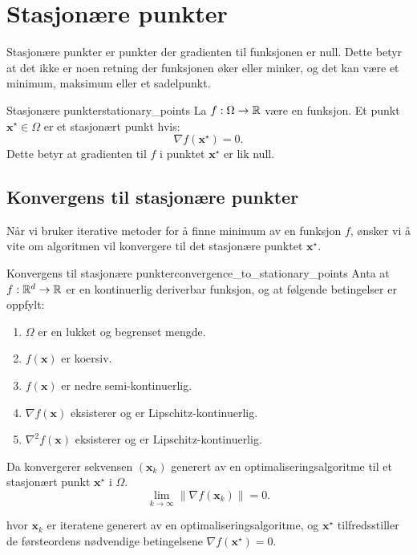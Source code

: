 \section{Stasjonære punkter}
Stasjonære punkter er punkter der gradienten til funksjonen er null. Dette betyr at det ikke er noen retning der funksjonen øker eller minker, og det kan være et minimum, maksimum eller et sadelpunkt.

\begin{definition}{Stasjonære punkter}{stationary_points}
	La \(f: \Omega \to \mathbb{R}\) være en funksjon. Et punkt \(\symbf{x}^\star \in \Omega\) er et stasjonært punkt hvis:
	\[
		\nabla f(\symbf{x}^\star) = 0.
	\]
	Dette betyr at gradienten til \(f\) i punktet \(\symbf{x}^\star\) er lik null.
\end{definition}

\subsection{Konvergens til stasjonære punkter}
Når vi bruker iterative metoder for å finne minimum av en funksjon \(f\), ønsker vi å vite om algoritmen vil konvergere til det stasjonære punktet \(\symbf{x}^\star\).

\begin{theorem}{Konvergens til stasjonære punkter}{convergence_to_stationary_points}
	Anta at \(f: \mathbb{R}^d \to \mathbb{R}\) er en kontinuerlig deriverbar funksjon, og at følgende betingelser er oppfylt:
	\begin{enumerate}
		\item \(\Omega\) er en lukket og begrenset mengde.
		\item \(f(\symbf{x})\) er koersiv.
		\item \(f(\symbf{x})\) er nedre semi-kontinuerlig.
		\item \(\nabla f(\symbf{x})\) eksisterer og er Lipschitz-kontinuerlig.
		\item \(\nabla^2 f(\symbf{x})\) eksisterer og er Lipschitz-kontinuerlig.
	\end{enumerate}
	Da konvergerer sekvensen \((\symbf{x}_k)\) generert av en optimaliseringsalgoritme til et stasjonært punkt \(\symbf{x}^\star\) i \(\Omega\).
	\[
		\lim_{k \to \infty} \|\nabla f(\symbf{x}_k)\| = 0.
	\]

	hvor \(\symbf{x}_k\) er iteratene generert av en optimaliseringsalgoritme, og \(\symbf{x}^\star\) tilfredsstiller de førsteordens nødvendige betingelsene \(\nabla f(\symbf{x}^\star) = 0\).

\end{theorem}

